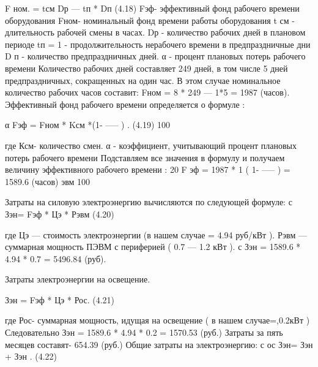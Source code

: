 \begin{ESKDexplanation}
\begin{ESKDexplanation}
\begin{ESKDexplanation}
\begin{ESKDexplanation}
 F ном.   = tсм  Dр — tп  * Dп                                                                                                    (4.18)                                     
 Fэф- эффективный фонд рабочего времени оборудования
 Fном- номинальный  фонд времени работы оборудования
 t см   -  длительность рабочей смены в часах.             
 Dр -       количество рабочих дней в плановом периоде
 tп = 1  -  продолжительность нерабочего времени в предпраздничные дни
 D п -   количество предпраздничных дней. 
 α  -   процент плановых потерь рабочего времени
Количество рабочих дней составляет 249 дней, в том числе 5 дней
предпраздничных, сокращенных на один час. В этом случае номинальное
количество рабочих часов составит:
                                 Fном =  8 * 249 — 1*5 = 1987 (часов).
Эффективный фонд  рабочего времени определяется о формуле :

                                                                                           α
                                  Fэф     =    Fном *     Kсм *(1-     -----    ) .                         (4.19)
                                                                                         100

где Ксм- количество смен.
α - коэффициент, учитывающий процент плановых потерь рабочего времени
Подставляем  все значения в формулу и получаем величину эффективного
       рабочего времени :
                                         20
     F эф = 1987 * 1 ( 1-   -----  )   = 1589.6  (часов)
     эвм                              100


Затраты на силовую электроэнергию вычисляются по следующей формуле:
                                            с
                                           Зэн= Fэф * Цэ * Рэвм                                                (4.20)

где Цэ — стоимость электроэнергии (в нашем случае = 4.94 руб/кВт ).
 Рэвм — суммарная мощность ПЭВМ с  периферией  ( 0.7 — 1.2 кВт ).
       с 
     Зэн =  1589.6 * 4.94 * 0.7 = 5496.84 (руб).

 Затраты электроэнергии на освещение.

                                            Зэн = Fэф * Цэ * Рос.                                               (4.21)

 где Рос- суммарная мощность, идущая на освещение ( в нашем случае=,0.2кВт )
Следовательно    Зэн = 1589.6 * 4.94 * 0.2 = 1570.53 (руб.)
Затраты за пять месяцев составят- 654.39 (руб.)
Общие затраты на электроэнергию:
                                                      с         ос
                                            Зэн= Зэн + Зэн  .                                                       (4.22)


\end{ESKDexplanation}
\end{ESKDexplanation}
\end{ESKDexplanation}
\end{ESKDexplanation}
